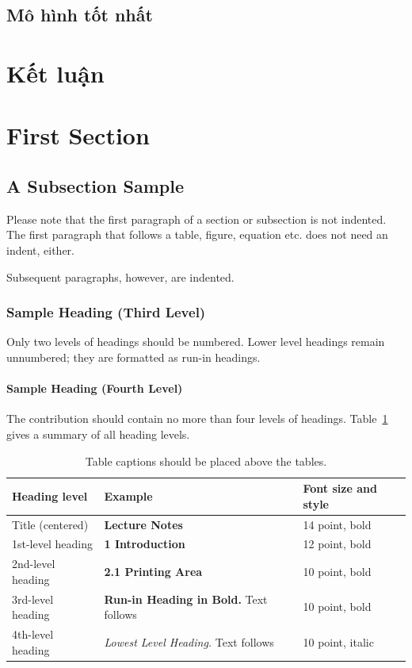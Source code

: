 \documentclass[runningheads]{llncs}
\begin{document}
\subsection{Mô hình tốt nhất}

\section{Kết luận}

\begin{thebibliography}{5}

\end{thebibliography}
\pagebreak
\section{First Section}
\subsection{A Subsection Sample}
Please note that the first paragraph of a section or subsection is
not indented. The first paragraph that follows a table, figure,
equation etc. does not need an indent, either.

Subsequent paragraphs, however, are indented.

\subsubsection{Sample Heading (Third Level)} Only two levels of
headings should be numbered. Lower level headings remain unnumbered;
they are formatted as run-in headings.

\paragraph{Sample Heading (Fourth Level)}
The contribution should contain no more than four levels of
headings. Table~\ref{tab3} gives a summary of all heading levels.

\begin{table}
\caption{Table captions should be placed above the
tables.}\label{tab3}
\begin{tabular}{|l|l|l|}
\hline
Heading level &  Example & Font size and style\\
\hline
Title (centered) &  {\Large\bfseries Lecture Notes} & 14 point, bold\\
1st-level heading &  {\large\bfseries 1 Introduction} & 12 point, bold\\
2nd-level heading & {\bfseries 2.1 Printing Area} & 10 point, bold\\
3rd-level heading & {\bfseries Run-in Heading in Bold.} Text follows & 10 point, bold\\
4th-level heading & {\itshape Lowest Level Heading.} Text follows & 10 point, italic\\
\hline
\end{tabular}
\end{table}
\end{document}
